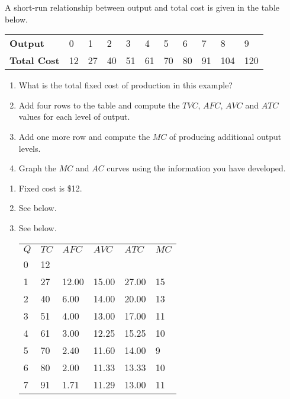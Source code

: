 \begin{enumialphparenastyle}
\begin{econex}\label{ex:ch8ex3}
A short-run relationship between output and total cost is given in the table below.
\begin{Table}{}
\begin{tabu} to \linewidth {|X[2.5,c]X[1,c]X[1,c]X[1,c]X[1,c]X[1,c]X[1,c]X[1,c]X[1,c]X[1,c]X[1,c]|}	\hline
{}	\textbf{Output}		&	0	&	1	&	2	&	3	&	4	&	5	&	6	&	7	&	8	&	9	\\
						\textbf{Total Cost}	&	12	&	27	&	40	&	51	&	61	&	70	&	80	&	91	&	104	&	120	\\	\hline
\end{tabu}
\end{Table}
\begin{enumerate}
	\item	What is the total fixed cost of production in this example?
	\item	Add four rows to the table and compute the $TVC$, $AFC$, $AVC$ and $ATC$ values for each level of output.
	\item	Add one more row and compute the $MC$ of producing additional output levels.
	\item	Graph the $MC$ and $AC$ curves using the information you have developed.
\end{enumerate}
\begin{econsolution}
\begin{enumerate}
	\item	Fixed cost is \$12.
	\item	See below.
	\item	See below.
	\begin{Table}{}
	\begin{tabu} to \linewidth {|X[1,c]X[1,c]X[1,c]X[1,c]X[1,c]X[1,c]|}	\hline
		\textbf{$Q$} & \textbf{$TC$} & \textbf{$AFC$} & \textbf{$AVC$} & \textbf{$ATC$} & \textbf{$MC$}	\\
		0	&	12	&		&		&		&		\\
		1	&	27	&	12.00	&	15.00	&	27.00	&	15	\\
		2	&	40	&	6.00	&	14.00	&	20.00	&	13	\\
		3	&	51	&	4.00	&	13.00	&	17.00	&	11	\\
		4	&	61	&	3.00	&	12.25	&	15.25	&	10	\\
		5	&	70	&	2.40	&	11.60	&	14.00	&	9	\\
		6	&	80	&	2.00	&	11.33	&	13.33	&	10	\\
		7	&	91	&	1.71	&	11.29	&	13.00	&	11	\\

\end{tabu}
\end{Table}
\end{enumerate}
\end{econsolution}
\end{econex}
\end{enumialphparenastyle}
